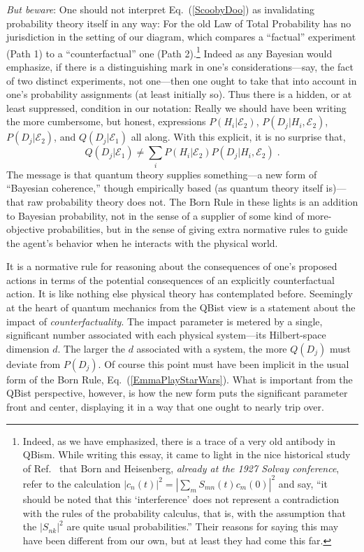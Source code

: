{\it But beware}:  One should not interpret Eq.~(\ref{ScoobyDoo}) as invalidating probability theory itself in any way:  For the old Law of Total Probability has no jurisdiction in the setting of our diagram, which compares a ``factual'' experiment (Path 1) to a ``counterfactual'' one (Path 2).\footnote{Indeed, as we have emphasized, there is a trace of a very old antibody in QBism.  While writing this essay, it came to light in the nice historical study of Ref.~\cite{Bacciagaluppi09} that Born and Heisenberg, {\it already at the 1927 Solvay conference}, refer to the calculation $|c_n(t)|^2=\left|\sum_m S_{mn}(t)c_m(0)\right|^2$ and say, ``it should be noted that this `interference' does not represent a contradiction with the rules of the probability calculus, that is, with the assumption that the $|S_{nk}|^2$ are quite usual probabilities.'' Their reasons for saying this may have been different from our own, but at least they had come this far.}  Indeed as any Bayesian would emphasize, if there is a distinguishing mark in one's considerations---say, the fact of two distinct experiments, not one---then one ought to take that into account in one's probability assignments (at least initially so).  Thus there is a hidden, or at least suppressed, condition in our notation:  Really we should have been writing the more cumbersome, but honest, expressions $P(H_i|{\mathcal E}_2)$, $P(D_j|H_i,{\mathcal E}_2)$, $P(D_j|{\mathcal E}_2)$, and $Q(D_j|{\mathcal E}_1)$ all along.  With this explicit, it is no surprise that,
\begin{equation}
Q(D_j|{\mathcal E}_1)\ne\sum_iP(H_i|{\mathcal E}_2)P(D_j|H_i,{\mathcal E}_2)\;.
\end{equation}
The message is that quantum theory supplies some\-thing---a new form of ``Bayesian coherence,'' though empirically based (as quantum theory itself is)---that raw probability theory does not.  The Born Rule in these lights is an addition to Bayesian probability, not in the sense of a supplier of some kind of more-objective probabilities, but in the sense of giving extra normative rules to guide the agent's behavior when he interacts with the physical world.

It is a normative rule for reasoning about the consequences of one's proposed actions in terms of the potential consequences of an explicitly counterfactual action.  It is like nothing else physical theory has contemplated before.  Seemingly at the heart of quantum mechanics from the QBist view is a statement about the impact of {\it counterfactuality\/}.  The impact parameter is metered by a single, significant number associated with each physical system---its Hilbert-space dimension $d$.  The larger the $d$ associated with a system, the more $Q(D_j)$ must deviate from $P(D_j)$.  Of course this point must have been implicit in the usual form of the Born Rule, Eq.~(\ref{EmmaPlayStarWars}).  What is important from the QBist perspective, however, is how the new form puts the significant parameter front and center, displaying it in a way that one ought to nearly trip over.

